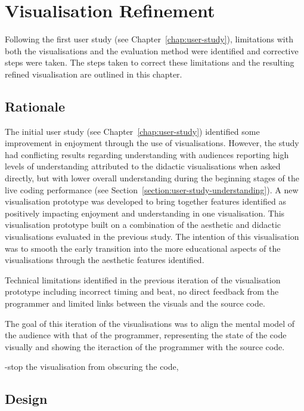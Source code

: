
\chapter{Visualisation Refinement}
\label{chap:visualisation-refinement}

Following the first user study (see Chapter~\ref{chap:user-study}), limitations with both the visualisations and the evaluation method were identified and corrective steps were taken. The steps taken to correct these limitations and the resulting refined visualisation are outlined in this chapter.

\section{Rationale}

The initial user study (see Chapter~\ref{chap:user-study}) identified some improvement in enjoyment through the use of visualisations. However, the study had conflicting results regarding understanding with audiences reporting high levels of understanding attributed to the didactic visualisations when asked directly, but with lower overall understanding during the beginning stages of the live coding performance (see Section~\ref{section:user-study-understanding}). A new visualisation prototype was developed to bring together features identified as positively impacting enjoyment and understanding in one visualisation. This visualisation prototype built on a combination of the aesthetic and didactic visualisations evaluated in the previous study. The intention of this visualisation was to smooth the early transition into the more educational aspects of the visualisations through the aesthetic features identified.

Technical limitations identified in the previous iteration of the visualisation prototype including incorrect timing and beat, no direct feedback from the programmer and limited links between the visuals and the source code. 

The goal of this iteration of the visualisations was to align the mental model of the audience with that of the programmer, representing the state of the code visually and showing the iteraction of the programmer with the source code.

-stop the visualisation from obscuring the code, 

\section{Design}

